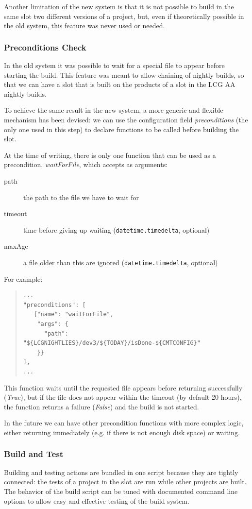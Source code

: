 \documentclass{lhcbnote}
\begin{document}
Another limitation of the new system is that it is not possible to build in the
same slot two different versions of a project, but, even if theoretically
possible in the old system, this feature was never used or needed.

\subsubsection{Preconditions Check}
\label{CoreTools:Preconditions}
In the old system it was possible to wait for a special file to appear before
starting the build.  This feature was meant to allow chaining of nightly builds,
so that we can have a slot that is built on the products of a slot in the LCG AA
nightly builds.

To achieve the same result in the new system, a more generic and flexible
mechanism has been devised: we can use the configuration field
\emph{preconditions} (the only one used in this step) to declare functions to be
called before building the slot.

At the time of writing, there is only one function that can be used as a
precondition, \emph{waitForFile}, which accepts as arguments:
\begin{description}
  \item[path] the path to the file we have to wait for
  \item[timeout] time before giving up waiting (\texttt{datetime.timedelta},
  optional)
  \item[maxAge] a file older than this are ignored (\texttt{datetime.timedelta},
  optional)
\end{description}
For example:
\begin{quote}
\begin{verbatim}
...
"preconditions": [
   {"name": "waitForFile",
    "args": {
      "path": "${LCGNIGHTLIES}/dev3/${TODAY}/isDone-${CMTCONFIG}"
    }}
],
...
\end{verbatim}
\end{quote}
This function waits until the requested file appears before returning
successfully (\emph{True}), but if the file does not appear within the timeout
(by default 20 hours), the function returns a failure (\emph{False}) and the
build is not started.

In the future we can have other precondition functions with more complex logic,
either returning immediately (e.g. if there is not enough disk space) or
waiting.

\subsubsection{Build and Test}
\label{CoreTools:Build}
Building and testing actions are bundled in one script because they are tightly
connected: the tests of a project in the slot are run while other projects are
built.  The behavior of the build script can be tuned with documented command
line options to allow easy and effective testing of the build system.
\end{document}
